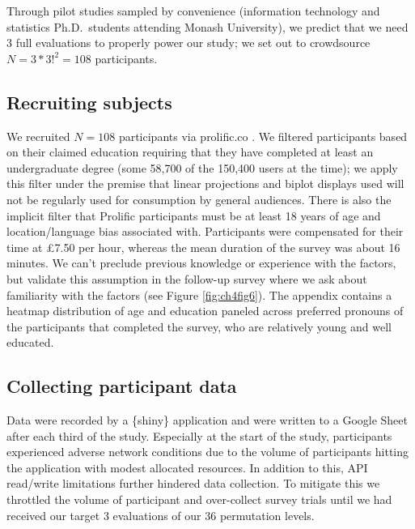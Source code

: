 \documentclass{template/monashthesis}
\begin{document}
Through pilot studies sampled by convenience (information technology and statistics Ph.D.~students attending Monash University), we predict that we need 3 full evaluations to properly power our study; we set out to crowdsource \(N = 3 * 3!^2 = 108\) participants.

\hypertarget{sec:subjects}{%
\subsection{Recruiting subjects}\label{sec:subjects}}

We recruited \(N = 108\) participants via prolific.co \autocite{palan_prolific_2018}. We filtered participants based on their claimed education requiring that they have completed at least an undergraduate degree (some 58,700 of the 150,400 users at the time); we apply this filter under the premise that linear projections and biplot displays used will not be regularly used for consumption by general audiences. There is also the implicit filter that Prolific participants must be at least 18 years of age and location/language bias associated with. Participants were compensated for their time at \pounds 7.50 per hour, whereas the mean duration of the survey was about 16 minutes. We can't preclude previous knowledge or experience with the factors, but validate this assumption in the follow-up survey where we ask about familiarity with the factors (see Figure \ref{fig:ch4fig6}). The appendix contains a heatmap distribution of age and education paneled across preferred pronouns of the participants that completed the survey, who are relatively young and well educated.

\hypertarget{collecting-participant-data}{%
\subsection{Collecting participant data}\label{collecting-participant-data}}

Data were recorded by a \{shiny\} application and were written to a Google Sheet after each third of the study. Especially at the start of the study, participants experienced adverse network conditions due to the volume of participants hitting the application with modest allocated resources. In addition to this, API read/write limitations further hindered data collection. To mitigate this we throttled the volume of participant and over-collect survey trials until we had received our target 3 evaluations of our 36 permutation levels.
\end{document}
